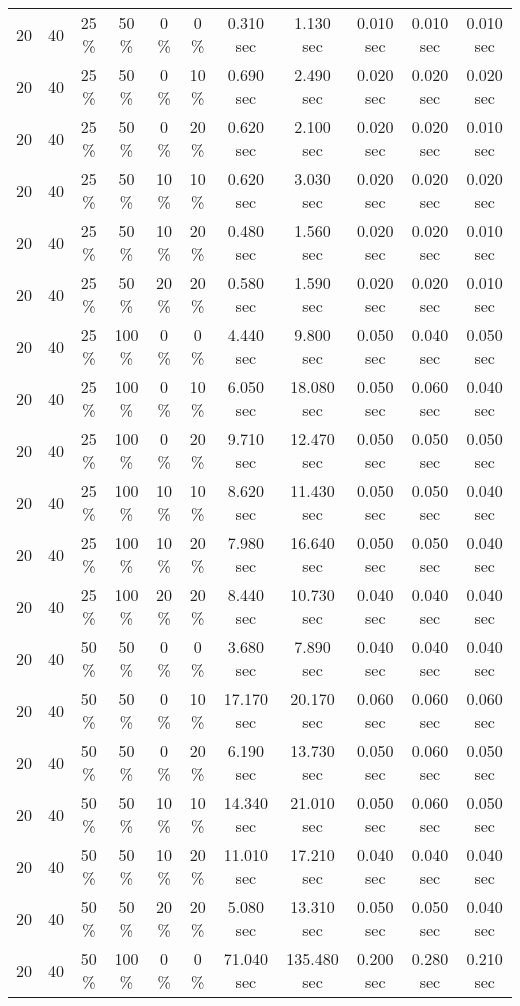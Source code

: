\documentclass{article}
\begin{document}
\begin{longtable}[]{@{}ccccccccccc@{}}
20 & 40 & 25 \% & 50 \% & 0 \% & 0 \% & 0.310 sec & 1.130 sec & 0.010 sec & 0.010 sec & 0.010 sec \\
20 & 40 & 25 \% & 50 \% & 0 \% & 10 \% & 0.690 sec & 2.490 sec & 0.020 sec & 0.020 sec & 0.020 sec \\
20 & 40 & 25 \% & 50 \% & 0 \% & 20 \% & 0.620 sec & 2.100 sec & 0.020 sec & 0.020 sec & 0.010 sec \\
20 & 40 & 25 \% & 50 \% & 10 \% & 10 \% & 0.620 sec & 3.030 sec & 0.020 sec & 0.020 sec & 0.020 sec \\
20 & 40 & 25 \% & 50 \% & 10 \% & 20 \% & 0.480 sec & 1.560 sec & 0.020 sec & 0.020 sec & 0.010 sec \\
20 & 40 & 25 \% & 50 \% & 20 \% & 20 \% & 0.580 sec & 1.590 sec & 0.020 sec & 0.020 sec & 0.010 sec \\
20 & 40 & 25 \% & 100 \% & 0 \% & 0 \% & 4.440 sec & 9.800 sec & 0.050 sec & 0.040 sec & 0.050 sec \\
20 & 40 & 25 \% & 100 \% & 0 \% & 10 \% & 6.050 sec & 18.080 sec & 0.050 sec & 0.060 sec & 0.040 sec \\
20 & 40 & 25 \% & 100 \% & 0 \% & 20 \% & 9.710 sec & 12.470 sec & 0.050 sec & 0.050 sec & 0.050 sec \\
20 & 40 & 25 \% & 100 \% & 10 \% & 10 \% & 8.620 sec & 11.430 sec & 0.050 sec & 0.050 sec & 0.040 sec \\
20 & 40 & 25 \% & 100 \% & 10 \% & 20 \% & 7.980 sec & 16.640 sec & 0.050 sec & 0.050 sec & 0.040 sec \\
20 & 40 & 25 \% & 100 \% & 20 \% & 20 \% & 8.440 sec & 10.730 sec & 0.040 sec & 0.040 sec & 0.040 sec \\
20 & 40 & 50 \% & 50 \% & 0 \% & 0 \% & 3.680 sec & 7.890 sec & 0.040 sec & 0.040 sec & 0.040 sec \\
20 & 40 & 50 \% & 50 \% & 0 \% & 10 \% & 17.170 sec & 20.170 sec & 0.060 sec & 0.060 sec & 0.060 sec \\
20 & 40 & 50 \% & 50 \% & 0 \% & 20 \% & 6.190 sec & 13.730 sec & 0.050 sec & 0.060 sec & 0.050 sec \\
20 & 40 & 50 \% & 50 \% & 10 \% & 10 \% & 14.340 sec & 21.010 sec & 0.050 sec & 0.060 sec & 0.050 sec \\
20 & 40 & 50 \% & 50 \% & 10 \% & 20 \% & 11.010 sec & 17.210 sec & 0.040 sec & 0.040 sec & 0.040 sec \\
20 & 40 & 50 \% & 50 \% & 20 \% & 20 \% & 5.080 sec & 13.310 sec & 0.050 sec & 0.050 sec & 0.040 sec \\
20 & 40 & 50 \% & 100 \% & 0 \% & 0 \% & 71.040 sec & 135.480 sec & 0.200 sec & 0.280 sec & 0.210 sec \\

\end{longtable}
\end{document}
